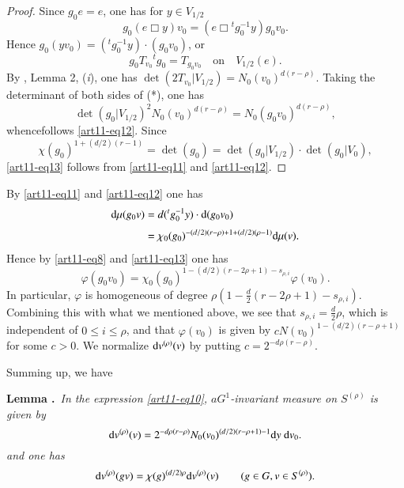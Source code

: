 \begin{proof}
Since $g_{0}e=e$, one has for $y\in V_{1/2}$
$$
g_{0}(e\Box y)v_{0}=(e\Box {}^{t}g^{-1}_{0}y)g_{0}v_{0}.
$$
Hence $g_{0}(yv_{0})=({}^{t}g^{-1}_{0}y)\cdot (g_{0}v_{0})$, or
\begin{equation*}
g_{0}T_{v_{0}}{}^{t}g_{0}=T_{g_{0}v_{0}}\quad\text{on}\quad V_{1/2}(e).\tag{*}
\end{equation*}
By \cite{art11-keySF}, Lemma 2, ({\em i}), one has $\det(2T_{v_{0}}|V_{1/2})=N_{0}(v_{0})^{d(r-\rho)}$. Taking the determinant of both sides of (*), one has
$$
\det (g_{0}|V_{1/2})^{2}N_{0}(v_{0})^{d(r-\rho)}=N_{0}(g_{0}v_{0})^{d(r-\rho)},
$$
whence\pageoriginale follows \eqref{art11-eq12}. Since
$$
\chi(g_{0})^{1+(d/2)(r-1)}=\det(g_{0})=\det(g_{0}|V_{1/2})\cdot \det(g_{0}|V_{0}),
$$
\eqref{art11-eq13} follows from \eqref{art11-eq11} and \eqref{art11-eq12}.
\end{proof}

By \eqref{art11-eq11} and \eqref{art11-eq12} one has
\begin{align*}
\mathrm{d} \mu(g_{0}v)&= d({}^{t}g_{0}^{-1}y)\cdot \mathrm{d}(g_{0}v_{0})\\[3pt]
&= \chi_{0}(g_{0})^{-(d/2)(r-\rho)+1+(d/2)(\rho-1)}\mathrm{d} \mu(v).
\end{align*}
Hence by \eqref{art11-eq8} and \eqref{art11-eq13} one has
$$
\varphi(g_{0}v_{0})=\chi_{0}(g_{0})^{1-(d/2)(r-2\rho+1)-s_{\rho,i}}\varphi(v_{0}).
$$
In particular, $\varphi$ is homogeneous of degree $\rho(1-\frac{d}{2}(r-2\rho+1)-s_{\rho,i})$. Combining this with what we mentioned above, we see that $s_{\rho,i}=\frac{d}{2}\rho$, which is independent of $0\leq i\leq \rho$, and that $\varphi(v_{0})$ is given by $cN(v_{0})^{1-(d/2)(r-\rho+1)}$ for some $c>0$. We normalize $\mathrm{d} v^{(\rho)}(v)$ by putting $c=2^{-d\rho(r-\rho)}$.

Summing up, we have

\medskip
\noindent
{\bf Lemma .\label{art11-thm3}}~{\em In the expression \eqref{art11-eq10}, $aG^{1}$-invariant measure on $S^{(\rho)}$ is given by}
\begin{equation}
\rmd v^{(\rho)}(v)=2^{-d\rho(r-\rho)}N_{0}(v_{0})^{(d/2)(r-\rho+1)-1}\rmd y \ \rmd v_{0}.\label{art11-eq14}
\end{equation}
{\em and one has}
\begin{equation}
\mathrm{d} v^{(\rho)}(gv)=\chi(g)^{(d/2)\rho}\mathrm{d} v^{(\rho)}(v)\qquad (g\in G, v\in S^{(\rho)}).\label{art11-eq15}
\end{equation}

